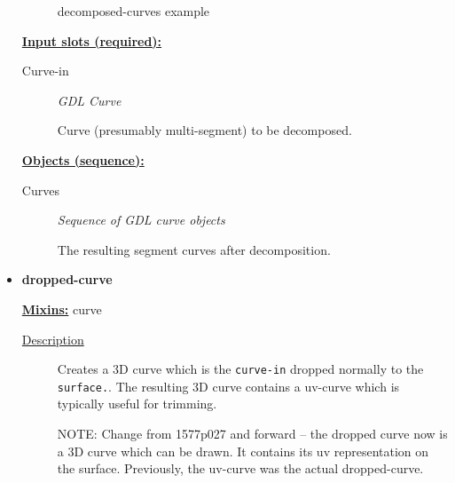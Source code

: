 \documentclass [11pt]{book}
\begin{document}
\begin{itemize}
\begin{figure}
\caption{decomposed-curves example}

\label{fig:decomposed-curves}

\end{figure}





\textbf{
\underline{Input slots (required):}}

\begin{description}

\item [Curve-in]
\emph{GDL Curve}

 Curve (presumably multi-segment) to be decomposed.




\end{description}






\textbf{
\underline{Objects (sequence):}}

\begin{description}

\item [Curves]
\emph{Sequence of GDL curve objects}

 The resulting segment curves after decomposition.




\end{description}







\item {}
\label{prim:dropped-curve}
\textbf{dropped-curve}


\textbf{
\underline{Mixins:}} curve





\begin{description}

\item [
\underline{Description}]


Creates a 3D curve which is the \texttt{curve-in} dropped normally to the \texttt{surface.}.
The resulting 3D curve contains a uv-curve which is typically useful for trimming.


NOTE: Change from 1577p027 and forward -- the dropped curve now is a 3D curve which 
can be drawn. It contains its uv representation on the surface. Previously, the uv-curve
was the actual dropped-curve.







\end{description}
\end{itemize}
\end{document}
